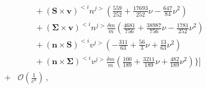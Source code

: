 {\begin{eqnarray}
&&\qquad + (\mathbf{S}\times\mathbf{v})^{<i} n^{j>}\left(\frac{559}{252} + \frac{17693}{252} \nu -\frac{647}{84} \nu^2\right) \nonumber \\ 
&&\qquad + (\mathbf{\Sigma}\times\mathbf{v})^{<i} n^{j>}\frac{\delta m}{m}\left(\frac{4681}{756} + \frac{38987}{756} \nu -\frac{1781}{252} \nu^2\right) \nonumber \\ 
&&\qquad + (\mathbf{n}\times\mathbf{S})^{<i} v^{j>}\left(-\frac{311}{63} + \frac{56}{3} \nu + \frac{13}{63} \nu^2\right) \nonumber \\ 
&&\qquad + (\mathbf{n}\times\mathbf{\Sigma})^{<i} v^{j>}\frac{\delta m}{m}\left(\frac{100}{189} + \frac{3211}{189} \nu + \frac{482}{189} \nu^2\right)\bigg\}\Bigg]\nonumber\\
&+&\mathcal{O}\left(\frac{1}{c^9}\right)\,,
\end{eqnarray}}